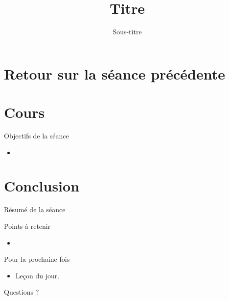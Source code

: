 \documentclass{beamer}
\title{Titre}
\subtitle{Sous-titre}
\author{\myname}
\date{}
\begin{document}
\begin{frame}[plain]
  \titlepage
\end{frame}

\section{Retour sur la séance précédente}

\section{Cours}

\begin{frame}{}
  \begin{alertblock}{Objectifs de la séance}
    \begin{itemize}
      \item
    \end{itemize}
  \end{alertblock}
\end{frame}

\section{Conclusion}

\begin{frame}{Résumé de la séance}

  \vfill
  \pause

  \begin{alertblock}{Points à retenir}
    \begin{itemize}
      \item
    \end{itemize}
  \end{alertblock}

  \vfill
  \pause

  \begin{alertblock}{Pour la prochaine fois}
    \begin{itemize}
      \item Leçon du jour.
    \end{itemize}
  \end{alertblock}

  \vfill
  \pause

  Questions ?\pause~

\end{frame}
\end{document}
